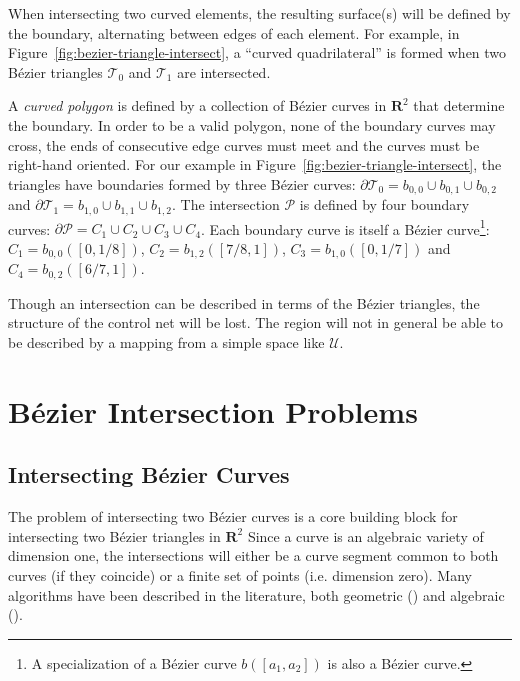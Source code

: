 \documentclass[letterpaper,10pt]{article}
\theoremstyle{definition}
\newcommand{\reals}{\mathbf{R}}
\newcommand{\utri}{\mathcal{U}}
\begin{document}
When intersecting two curved elements, the resulting surface(s) will
be defined by the boundary, alternating between edges of each
element.
For example, in Figure~\ref{fig:bezier-triangle-intersect}, a
``curved quadrilateral'' is formed when two B\'{e}zier triangles
\(\mathcal{T}_0\) and \(\mathcal{T}_1\) are intersected.

A \emph{curved polygon} is defined by a collection of B\'{e}zier curves
in \(\reals^2\) that determine the boundary. In order to be
a valid polygon, none of the boundary curves may cross, the
ends of consecutive edge curves must meet and the curves must be right-hand
oriented. For our example in
Figure~\ref{fig:bezier-triangle-intersect}, the triangles
have boundaries formed by three B\'{e}zier curves:
\(\partial \mathcal{T}_0 = b_{0, 0} \cup b_{0, 1} \cup b_{0, 2}\) and
\(\partial \mathcal{T}_1 = b_{1, 0} \cup b_{1, 1} \cup b_{1, 2}\).
The intersection \(\mathcal{P}\) is defined by four boundary
curves: \(\partial \mathcal{P} =
C_1 \cup C_2 \cup C_3 \cup C_4\). Each boundary
curve is itself a B\'{e}zier curve\footnote{A specialization of a
B\'{e}zier curve \(b\left(\left[a_1, a_2\right]\right)\)
is also a B\'{e}zier curve.}:
\(C_1 = b_{0, 0}\left(\left[0, 1/8\right]\right)\),
\(C_2 = b_{1, 2}\left(\left[7/8, 1\right]\right)\),
\(C_3 = b_{1, 0}\left(\left[0, 1/7\right]\right)\) and
\(C_4 = b_{0, 2}\left(\left[6/7, 1\right]\right)\).

Though an intersection can be described in terms of the B\'{e}zier triangles,
the structure of the control net will be lost. The region will not in general
be able to be described by a mapping from a simple space like
\(\utri\).

\section{B\'{e}zier Intersection Problems}\label{sec:bezier-intersection}

\subsection{Intersecting B\'{e}zier Curves}

The problem of intersecting two B\'{e}zier curves is a core building
block for intersecting two B\'{e}zier triangles in \(\reals^2\)
Since a curve is an algebraic variety of dimension one,
the intersections will either be a curve segment common to both curves (if
they coincide) or a finite set of points (i.e. dimension zero).
Many algorithms have been described in the literature, both
geometric (\cite{Sederberg1986, Sederberg1990, Kim1998}) and
algebraic (\cite{Manocha:CSD-92-698}).
\end{document}
